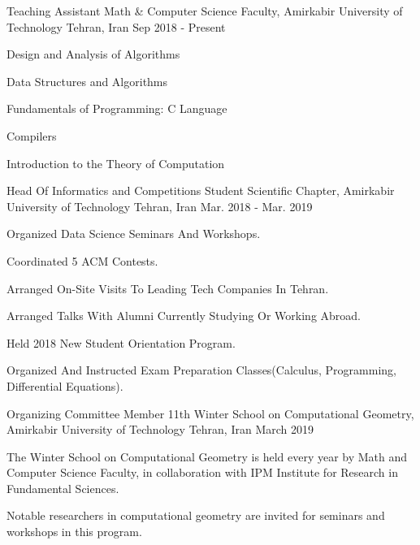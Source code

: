 \documentclass[11pt, a4paper]{awesome-cv}
\begin{document}
\begin{cventries}
	
	\cventry
	{Teaching Assistant} %
	{Math \& Computer Science Faculty, Amirkabir University of Technology} %
	{Tehran, Iran} %
	{Sep 2018 - Present} %
	{
		\begin{cvitems} %
			\item {Design and Analysis of Algorithms}
			\item {Data Structures and Algorithms}
			\item {Fundamentals of Programming: C Language}
			\item {Compilers}
			\item {Introduction to the Theory of Computation}
		\end{cvitems}
	}
	
	\cventry
	{Head Of Informatics and Competitions} %
	{Student Scientific Chapter, Amirkabir University of Technology} %
	{Tehran, Iran} %
	{Mar. 2018 - Mar. 2019} %
	{
		\begin{cvitems} %
			\item {Organized Data Science Seminars And Workshops.}
			\item {Coordinated 5 ACM Contests.}
			\item {Arranged On-Site Visits To Leading Tech Companies In Tehran.}
			\item {Arranged Talks With Alumni Currently Studying Or Working Abroad.}
			\item {Held 2018 New Student Orientation Program.}
			\item {Organized And Instructed Exam Preparation Classes(Calculus, Programming, Differential Equations).}
		\end{cvitems}
	}
	
	\cventry
	{Organizing Committee Member} %
	{11th Winter School on Computational Geometry, Amirkabir University of Technology} %
	{Tehran, Iran} %
	{March 2019} %
	{
		\begin{cvitems} %
			\item 	{The Winter School on Computational Geometry is held every year by Math and Computer Science Faculty, in collaboration with IPM Institute for Research in Fundamental Sciences.}
			\item {Notable researchers in computational geometry are invited for seminars and workshops in this program.}
		\end{cvitems}
	}
	
\end{cventries}
\end{document}
